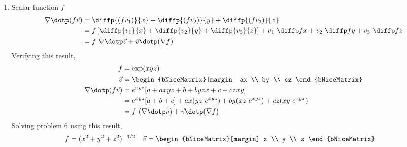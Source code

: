 \begin{enumerate}
\begin{enumerate}
              \item Scalar function $ f $
                    \begin{align}
                        \nabla \dotp (f\vec{v}) & = \diffp{(fv_1)}{x}
                        + \diffp{(fv_2)}{y}
                        + \diffp{(fv_3)}{z}                                 \\
                                                & = f \left[ \diffp{v_1}{x}
                            + \diffp{v_2}{y}
                            + \diffp{v_3}{z} \right] + v_1\ \diffp fx + v_2\ \diffp fy
                        + v_3\ \diffp fz                                    \\
                                                & = f\ \nabla \dotp \vec{v}
                        + \vec{v} \dotp (\nabla f)
                    \end{align}
                    Verifying this result,
                    \begin{align}
                        f                       & = \exp(xyz)                   \\
                        \vec{v}                 & = \begin{bNiceMatrix}[margin]
                                                        ax \\ by \\ cz
                                                    \end{bNiceMatrix}  \\
                        \nabla \dotp (f\vec{v}) & = e^{xyz}[a + axyz + b + byzx
                        + c + czxy]                                             \\
                                                & =
                        e^{xyz} [a + b + c] + ax(yz\ e^{xyz}) + by(xz\ e^{xyz})
                        + cz(xy\ e^{xyz})                                       \\
                                                & = f\ (\nabla \dotp \vec{v})
                        + \vec{v} \dotp (\nabla f)
                    \end{align}
                    Solving problem $ 6 $ using this result,
                    \begin{align}
                        f                        & = (x^2 + y^2 + z^2)^{-3/2}      &
                        \vec{v}                  & = \begin{bNiceMatrix}[margin]
                                                         x \\ y \\ z

\end{bNiceMatrix}
\end{align}
\end{enumerate}
\end{enumerate}
